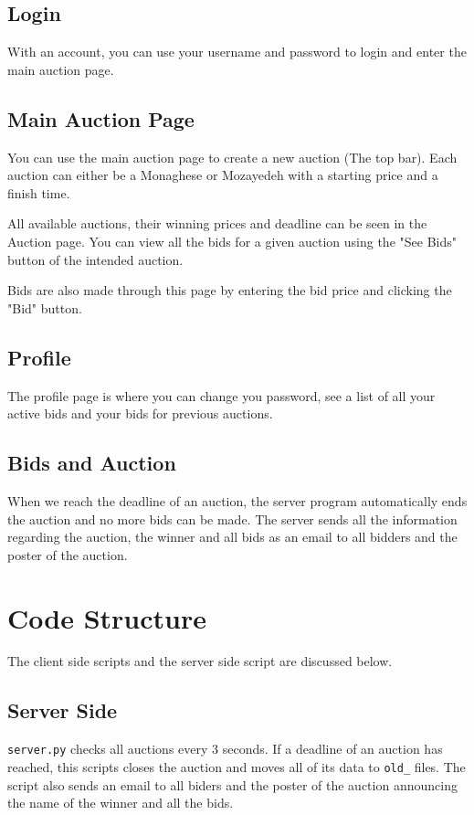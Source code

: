\documentclass{article}
\begin{document}
\subsection{Login}
With an account, you can use your username and password to login and enter the main auction page.

\subsection{Main Auction Page}

You can use the main auction page to create a new auction (The top bar). Each auction can either be a Monaghese or Mozayedeh with a starting price and a finish time. 

All available auctions, their winning prices and deadline can be seen in the Auction page. You can view all the bids for a given auction using the "See Bids" button of the intended auction.

Bids are also made through this page by entering the bid price and clicking the "Bid" button.

\subsection{Profile}
The profile page is where you can change you password, see a list of all your active bids and your bids for previous auctions.

\subsection{Bids and Auction}

When we reach the deadline of an auction, the server program automatically ends the auction and no more bids can be made. The server sends all the information regarding the auction, the winner and all bids as an email to all bidders and the poster of the auction.

\section{Code Structure}
The client side scripts and the server side script are discussed below.

\subsection{Server Side}
\texttt{server.py} checks all auctions every 3 seconds. If a deadline of an auction has reached, this scripts closes the auction and moves all of its data to \texttt{old\_} files. The script also sends an email to all biders and the poster of the auction announcing the name of the winner and all the bids.
\end{document}
